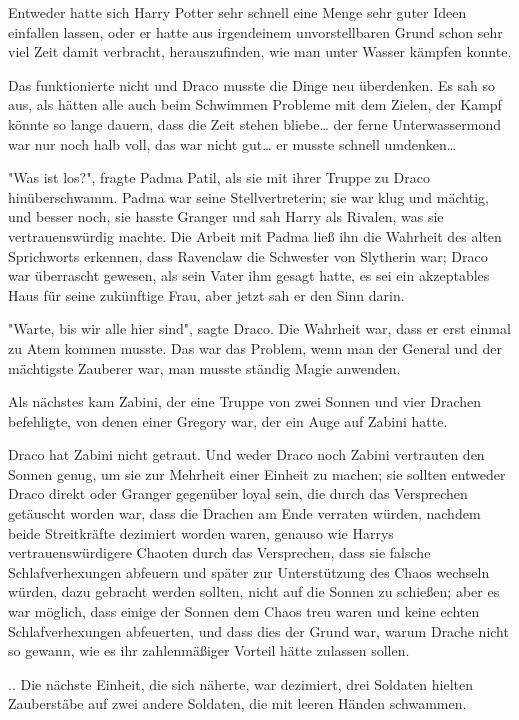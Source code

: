 {Entweder hatte sich Harry Potter sehr schnell eine Menge sehr guter Ideen einfallen lassen, oder er hatte aus irgendeinem unvorstellbaren Grund schon sehr viel Zeit damit verbracht, herauszufinden, wie man unter Wasser kämpfen konnte.

Das funktionierte nicht und Draco musste die Dinge neu überdenken. Es sah so aus, als hätten alle auch beim Schwimmen Probleme mit dem Zielen, der Kampf könnte so lange dauern, dass die Zeit stehen bliebe… der ferne Unterwassermond war nur noch halb voll, das war nicht gut… er musste schnell umdenken…

"Was ist los?", fragte Padma Patil, als sie mit ihrer Truppe zu Draco hinüberschwamm. Padma war seine Stellvertreterin; sie war klug und mächtig, und besser noch, sie hasste Granger und sah Harry als Rivalen, was sie vertrauenswürdig machte. Die Arbeit mit Padma ließ ihn die Wahrheit des alten Sprichworts erkennen, dass Ravenclaw die Schwester von Slytherin war; Draco war überrascht gewesen, als sein Vater ihm gesagt hatte, es sei ein akzeptables Haus für seine zukünftige Frau, aber jetzt sah er den Sinn darin.

"Warte, bis wir alle hier sind", sagte Draco. Die Wahrheit war, dass er erst einmal zu Atem kommen musste. Das war das Problem, wenn man der General und der mächtigste Zauberer war, man musste ständig Magie anwenden.

Als nächstes kam Zabini, der eine Truppe von zwei Sonnen und vier Drachen befehligte, von denen einer Gregory war, der ein Auge auf Zabini hatte.

Draco hat Zabini nicht getraut. Und weder Draco noch Zabini vertrauten den Sonnen genug, um sie zur Mehrheit einer Einheit zu machen; sie sollten entweder Draco direkt oder Granger gegenüber loyal sein, die durch das Versprechen getäuscht worden war, dass die Drachen am Ende verraten würden, nachdem beide Streitkräfte dezimiert worden waren, genauso wie Harrys vertrauenswürdigere Chaoten durch das Versprechen, dass sie falsche Schlafverhexungen abfeuern und später zur Unterstützung des Chaos wechseln würden, dazu gebracht werden sollten, nicht auf die Sonnen zu schießen; aber es war möglich, dass einige der Sonnen dem Chaos treu waren und keine echten Schlafverhexungen abfeuerten, und dass dies der Grund war, warum Drache nicht so gewann, wie es ihr zahlenmäßiger Vorteil hätte zulassen sollen.

.. Die nächste Einheit, die sich näherte, war dezimiert, drei Soldaten hielten Zauberstäbe auf zwei andere Soldaten, die mit leeren Händen schwammen.

}
